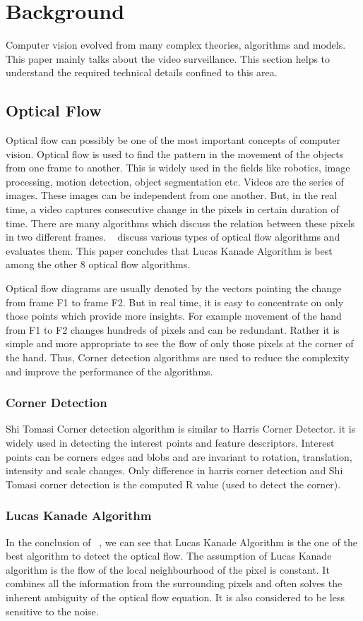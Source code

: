 \chapter{Background}
Computer vision evolved from many complex theories, algorithms and models. This paper mainly talks 
about the video surveillance. This section helps to understand the required technical details confined to this area. 
\section{Optical Flow}
Optical flow can possibly be one of the most important concepts of computer vision. Optical flow is used 
to find the pattern in the movement of the objects from one frame to another. This is widely used in the 
fields like robotics, image processing, motion detection, object segmentation etc. Videos are the series of 
images. These images can be independent from one another. But, in the real time, a video captures 
consecutive change in the pixels in certain duration of time. There are many algorithms which discuss 
the relation between these pixels in two different frames. ~\cite{galvin1998recovering} discuss various 
types of optical flow algorithms and evaluates them. This paper concludes that Lucas Kanade Algorithm 
is best among the other 8 optical flow algorithms.

Optical flow diagrams are usually denoted by the vectors pointing the change from frame F1 to frame F2. But in real time, it is easy to concentrate on only those points which provide more insights. For example movement of the hand from F1 to F2 changes hundreds of pixels and can be redundant. Rather it is simple and more appropriate to see the flow of only those pixels at the corner of the hand. Thus, Corner detection algorithms are used to reduce the complexity and improve the performance of the algorithms.
\subsection{Corner Detection}
Shi Tomasi Corner detection algorithm is similar to Harris Corner Detector. it is widely used in detecting the interest points and feature descriptors. Interest points can be corners edges and blobs and are invariant to rotation, translation, intensity and scale changes. Only difference in harris corner detection and Shi Tomasi corner detection is the computed R value (used to detect the corner).
\subsection{Lucas Kanade Algorithm}
In the conclusion of ~\cite{galvin1998recovering}, we can see that Lucas Kanade Algorithm is the one of the best algorithm to detect the optical flow. The assumption of Lucas Kanade algorithm is the flow of the local neighbourhood of the pixel is constant. It combines all the information from the surrounding pixels and often solves the inherent ambiguity of the optical flow equation. It is also considered to be less sensitive to the noise. 
